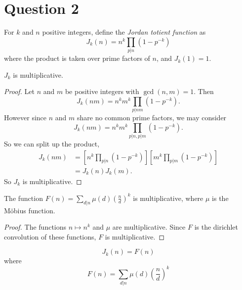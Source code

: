 \documentclass{unswmaths}
\begin{document}
\section*{Question 2}
\begin{definition}
    For $k$ and $n$ positive integers, define the \emph{Jordan totient function} as
    \begin{equation*}
        J_k(n) = n^k\prod_{p|n} (1-p^{-k})
    \end{equation*}
    where the product is taken over prime factors of $n$, and $J_k(1) = 1$.
\end{definition}
\begin{lemma}
    $J_k$ is multiplicative.
\end{lemma}
\begin{proof}
    Let $n$ and $m$ be positive integers with $\gcd(n,m) = 1$. Then
    \begin{equation*}
        J_k(nm) = n^km^k\prod_{p|nm}(1-p^{-k}).
    \end{equation*}
    However since $n$ and $m$ share no common prime factors, we may consider
    \begin{equation*}
        J_k(nm) = n^km^k\prod_{p|n,p|m} (1-p^{-k}).
    \end{equation*}
    So we can split up the product,
    \begin{align*}
        J_k(nm) &= \left[n^k\prod_{p|n}(1-p^{-k})\right]\left[m^k\prod_{p|m}(1-p^{-k})\right]\\
        &= J_k(n)J_k(m).
    \end{align*}
    So $J_k$ is multiplicative.
\end{proof}
\begin{lemma}
    The function $F(n) = \sum_{d|n}\mu(d)\left(\frac{n}{d}\right)^k$ is multiplicative, where 
    $\mu$ is the M\"obius function.
\end{lemma}
\begin{proof}
    The functions $n\mapsto n^k$ and $\mu$ are multiplicative.
    Since $F$ is the dirichlet convolution of these functions, $F$
    is multiplicative.    
\end{proof}
\begin{theorem}
    \begin{equation*}
        J_k(n) = F(n)
    \end{equation*}
    where 
    \begin{equation*}
        F(n) = \sum_{d|n} \mu(d)\left(\frac{n}{d}\right)^k
    \end{equation*}
\end{theorem}
\end{document}
